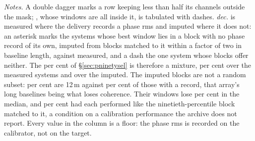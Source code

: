 \begin{table}
\centering
\caption{\textbf{Per-system sensitivity of the carrier search.} For each of
the \NSysClassA{} systems the fine-channel search covers, the
$\mathrm{EIRP}_{90}$ of its best window with its own primary-beam,
annual-parallax and smearing retentions applied, ordered by the limit.
Columns and daggers are defined in Appendix~\ref{app:persys}; the notes
below give the other marks.}
\label{tab:persys}
\footnotesize


{\footnotesize\raggedright \emph{Notes.} A double dagger marks a row
keeping less than half its channels outside the mask; \NSysALostName, whose
\UmNWinALostWin{} windows are all inside it, is tabulated with dashes.
\emph{dec.} is measured where the delivery records a phase rms and imputed
where it does not: an asterisk marks the \NgNDecImpSys{} systems whose best
window lies in a block with no phase record of its own, imputed from blocks
matched to it within a factor of two in baseline length, against
\NgNDecMeasSys{} measured, and a dash the one system whose blocks offer
neither. The \NmDecSysMedPct{} per cent of \S\ref{sec:pninetysel} is
therefore a mixture, \NgDecMeasMedPct{} per cent over the measured systems
and \NgDecImpMedPct{} over the imputed. The imputed blocks are not a random
subset: \NbDecPctTwelveUn{} per cent are 12\,m against
\NbDecPctTwelveMeas{} per cent of those with a record, that array's long
baselines being what loses coherence. Their windows lose
\RpDecMatchMed{} per cent in the median, and \RpDecMatchHi{} per cent had each
performed like the ninetieth-percentile block matched to it, a condition on a
calibration performance the archive does not report. Every value in the
column is a floor: the phase rms is recorded on the calibrator, not on the
target.\par}
\end{table}
